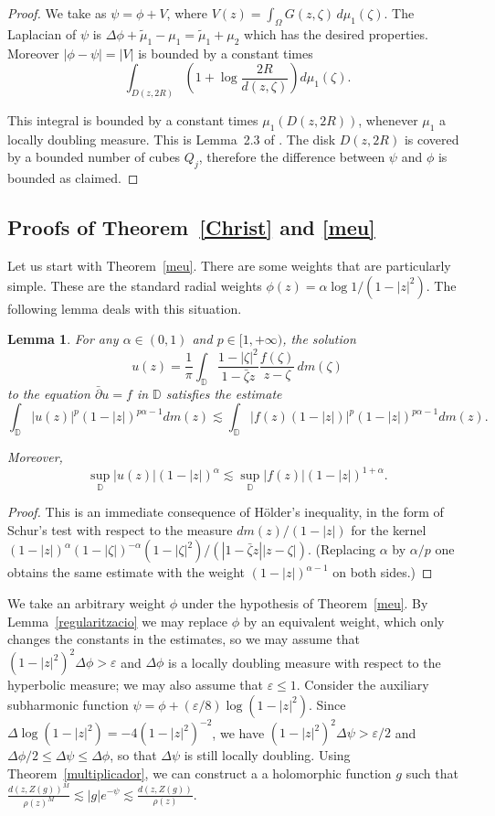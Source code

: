 \documentclass[12pt,twoside,final,psamsfonts]{amsart}
\theoremstyle{plain}
\newtheorem{lema}{Lemma}
\theoremstyle{remark}
\theoremstyle{definition}
\newcommand{\D}{{\mathbb D}}
\newcommand{\dbar}{\bar\partial}
\begin{document}
\begin{proof}
We take as $\psi=\phi +V$, where $V(z)=\int_\Omega G(z,\zeta)\,d\mu_1(\zeta)$.
The Laplacian of $\psi$ is $\Delta\phi+\widetilde\mu_1-\mu_1=\widetilde\mu_1+\mu_2$ which has the desired 
properties. Moreover $|\phi-\psi|=|V|$ is bounded
by a constant times
\[
\int_{D(z,2R)}\left(1+\log \frac{2R}{d(z,\zeta)}\right) d\mu_1(\zeta).
\]

This integral is bounded by a constant times $\mu_1(D(z,2R))$, whenever $\mu_1$ 
a locally
doubling measure. This is Lemma~2.3 of \cite{Christ91}. 
The disk $D(z,2R)$ is covered by a 
bounded number of cubes $Q_j$, therefore the difference between 
$\psi$ and $\phi$
is bounded as claimed.
\end{proof}

\subsection{Proofs of Theorem~\ref{Christ} and \ref{meu}}
Let us start with Theorem~\ref{meu}. There are some weights  that are
particularly simple. These are the standard radial weights  $\phi(z)=\alpha\log
1/(1-|z|^2)$. The following lemma deals with this situation.

\begin{lema}\label{pes}
For any $\alpha\in (0,1)$ and $p\in[1,+\infty)$, the solution
\[
u(z)=\frac 1\pi \int_{\D}\frac{1-|\zeta|^2}{1-\bar\zeta
z}\frac{f(\zeta)}{z-\zeta}\, dm(\zeta)
\]
to the equation $\dbar u=f$ in $\D$ satisfies the estimate
\[
\int_\D |u(z)|^p (1-|z|)^{p\alpha-1} dm(z)\lesssim
\int_\D |f(z)(1-|z|)|^p (1-|z|)^{p\alpha-1} dm(z).
\]

Moreover,
\[
\sup_{\D} |u(z)|(1-|z|)^\alpha\lesssim \sup_{\D} |f(z)|(1-|z|)^{1+\alpha}.
\]
\end{lema}

\begin{proof}
This is an immediate consequence of H\"older's inequality, in the form of
Schur's test with respect to the measure $dm(z)/(1-|z|)$ for the kernel
$(1-|z|)^{\alpha}(1-|\zeta|)^{-\alpha}(1-|\zeta|^2)/(|1-\bar\zeta z||z-\zeta|)$.
(Replacing $\alpha$ by $\alpha/p$ one obtains the same estimate with the weight
$(1-|z|)^{\alpha-1}$ on both sides.)
\end{proof}

We take an arbitrary weight $\phi$ under the hypothesis of 
Theorem~\ref{meu}. By Lemma~\ref{regularitzacio} we may replace $\phi$ by an equivalent weight,
which only changes the constants in the estimates, so we may assume that
$(1-|z|^2)^2\Delta \phi>\varepsilon$ and $\Delta\phi$ is a locally
doubling measure with
respect to the hyperbolic measure; we may also assume that $\varepsilon\le 1$.
Consider the auxiliary subharmonic function
$\psi=\phi + (\varepsilon/8) \log (1-|z|^2)$. Since
$\Delta\log(1-|z|^2)=-4(1-|z|^2)^{-2}$, we have
$(1-|z|^2)^2\Delta \psi>\varepsilon/2$ 
and $\Delta\phi/2\le\Delta\psi\le\Delta\phi$, so that $\Delta\psi$ is still locally doubling. 
Using Theorem~\ref{multiplicador}, we can construct a
a holomorphic function $g$ such that  
$\frac{d(z,Z(g))^M}{\rho(z)^M}\lesssim |g|e^{-\psi}
\lesssim\frac{d(z,Z(g))}{\rho(z)}$.
\end{document}

